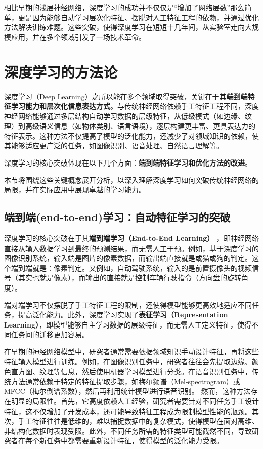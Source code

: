 相比早期的浅层神经网络，深度学习的成功并不仅仅是“增加了网络层数”那么简单，更是因为能够自动学习层次化特征、摆脱对人工特征工程的依赖，并通过优化方法解决训练难题。这些突破，使得深度学习在短短十几年间，从实验室走向大规模应用，并在多个领域引发了一场技术革命。

 \section{深度学习的方法论}

深度学习（Deep Learning）之所以能在多个领域取得突破，关键在于其{\bf 端到端特征学习能力和层次化信息表达方式}。与传统神经网络依赖手工特征工程不同，深度神经网络能够通过多层结构自动学习数据的层级特征，从低级模式（如边缘、纹理）到高级语义信息（如物体类别、语言语境），逐层构建更丰富、更具表达力的特征表示。这种方法不仅提高了模型的泛化能力，还减少了对领域知识的依赖，使其能够适应更广泛的任务，如图像识别、语音处理、自然语言理解等。

深度学习的核心突破体现在以下几个方面：{\bf 端到端特征学习和优化方法的改进}。

本节将围绕这些关键概念展开分析，以深入理解深度学习如何突破传统神经网络的局限，并在实际应用中展现卓越的学习能力。

\subsection{端到端(end-to-end)学习：自动特征学习的突破}

深度学习的核心突破在于其{\bf 端到端学习（End-to-End Learning）} ，即神经网络直接从输入数据学习到最终的预测结果，而无需人工干预。例如，基于深度学习的图像识别系统，输入端是图片的像素数据，而输出端直接就是或猫或狗的判定。这个端到端就是：像素判定。又例如，自动驾驶系统，输入的是前置摄像头的视频信号（其实也就是像素），而输出的直接就是控制车辆行驶指令（方向盘的旋转角度）。

端对端学习不仅摆脱了手工特征工程的限制，还使得模型能够更高效地适应不同任务，提高泛化能力。此外，深度学习实现了{\bf 表征学习（Representation Learning）}，即模型能够自主学习数据的层级特征，而无需人工定义特征，使得不同任务间的迁移更加容易。

在早期的神经网络模型中，研究者通常需要依据领域知识手动设计特征，再将这些特征输入模型进行训练。例如，在图像识别任务中，研究者往往会先提取边缘、颜色直方图、纹理等信息，然后使用机器学习模型进行分类。在语音识别任务中，传统方法通常依赖于特定的特征提取步骤，如梅尔频谱（Mel-spectrogram）或 MFCC（梅尔倒谱系数），然后再利用统计模型进行语音识别。
然而，这种方法存在明显的局限性。首先，它高度依赖人工经验，研究者需要针对不同任务手工设计特征，这不仅增加了开发成本，还可能导致特征工程成为限制模型性能的瓶颈。其次，手工特征往往是低维的，难以捕捉数据中的复杂模式，使得模型在面对高维、非结构化数据时表现受限。此外，不同任务所需的特征类型可能截然不同，导致研究者在每个新任务中都需要重新设计特征，使得模型的泛化能力受限。

